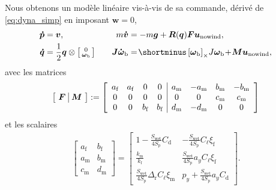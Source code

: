         Nous obtenons un modèle linéaire vis-à-vis de sa commande, dérivé de \eqref{eq:dyna_simp} en imposant  $\boldsymbol{w} = 0$,
        \begin{subequations}\label{eq:withouwind}
        \begin{align}
                \boldsymbol{\dot p} &=  \boldsymbol{v}, \quad &
                m\boldsymbol{\dot v} &= - m\boldsymbol{g} +  \boldsymbol{R}(\boldsymbol{q})\boldsymbol{F}\boldsymbol{u}_{\text{nowind}},\\
                \boldsymbol{\dot q} &= \frac{1}{2}\boldsymbol{q} \otimes \smallmat{0 \\ \boldsymbol{\omega}_{\text{b}}} \quad & \boldsymbol{J} \boldsymbol{\dot \omega}_{\text{b}} &= \! \shortminus \skewsym{\boldsymbol{\omega}_{\text{b}}}\!J\boldsymbol{\omega}_{\text{b}} \! + \! \boldsymbol{M}\boldsymbol{u}_{\text{nowind}},
        \end{align}
        \end{subequations}
        avec les matrices
        \begin{align}
            \label{eq:FandM}
            \left[ \begin{array}{c|c}\!\boldsymbol{F}\!&\!\boldsymbol{M}\!\end{array} \right] := \left[ \begin{array}{cccc | cccc} a_{\text{f}} & a_{\text{f}} & 0 & 0 & a_{\text{m}} & -a_{\text{m}} & b_{\text{m}} & -b_{\text{m}} \\  0 & 0 & 0 & 0 & 0 & 0 & c_{\text{m}} & c_{\text{m}} \\ 0 & 0 & b_{\text{f}} & b_{\text{f}} & d_{\text{m}} & -d_{\text{m}} & 0 & 0 \end{array} \right]
        \end{align}
        et les scalaires
            \begin{align*}
                \left[\!\! \begin{array}{c|c} 
                a_{\text{f}} & b_{\text{f}} \\ \hline
                a_{\text{m}} & b_{\text{m}} \\ \hline
                c_{\text{m}} & d_{\text{m}}
                \end{array} \!\!\right] \!=\!
                \left[\begin{array}{c|c}
                1-\frac{S_{\text{wet}}}{4S_{\text{p}}} C_{\text{d}}  & -\frac{S_{\text{wet}}}{4S_{\text{p}}}C_{\ell}\xi_{\text{f}} \\ \hline
                \frac{k_{\text{m}} }{k_{\text{f}}}  &   \! \frac{S_{\text{wet}}}{4S_{\text{p}}}a_{y}C_{\ell}\xi_{\text{f}} \!\\ \hline
                \!\! \frac{S_{\text{wet}}}{4S_{\text{p}}} \Delta_{\text{r}}C_{\ell}\xi_{\text{m}} \!\! & 
                p_{y}+\frac{S_{\text{wet}}}{4S_{\text{p}}} a_{y} C_{\text{d}}
                \end{array}\right].
            \end{align*}


